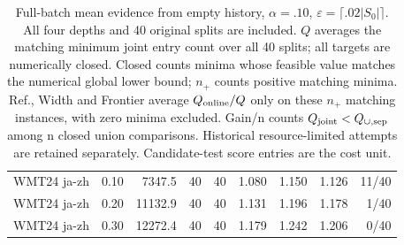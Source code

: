 \begin{table}[t]
\begin{tabular}{lrrrrrrrr}
WMT24 ja-zh & 0.10 & 7347.5 & 40 & 40 & 1.080 & 1.150 & 1.126 & 11/40 \\
WMT24 ja-zh & 0.20 & 11132.9 & 40 & 40 & 1.131 & 1.196 & 1.178 & 1/40 \\
WMT24 ja-zh & 0.30 & 12272.4 & 40 & 40 & 1.179 & 1.242 & 1.206 & 0/40 \\
\bottomrule
\end{tabular}
\caption{Full-batch mean evidence from empty history, $\alpha=.10$, $\varepsilon=\lceil .02|S_0|\rceil$. All four depths and 40 original splits are included. $Q$ averages the matching minimum joint entry count over all 40 splits; all targets are numerically closed. Closed counts minima whose feasible value matches the numerical global lower bound; $n_+$ counts positive matching minima. Ref., Width and Frontier average $Q_{\rm online}/Q$ only on these $n_+$ matching instances, with zero minima excluded. Gain/n counts $Q_{\rm joint}<Q_{\cup,\rm sep}$ among n closed union comparisons. Historical resource-limited attempts are retained separately. Candidate-test score entries are the cost unit.}
\label{tab:full-mean-primary}
\end{table}
